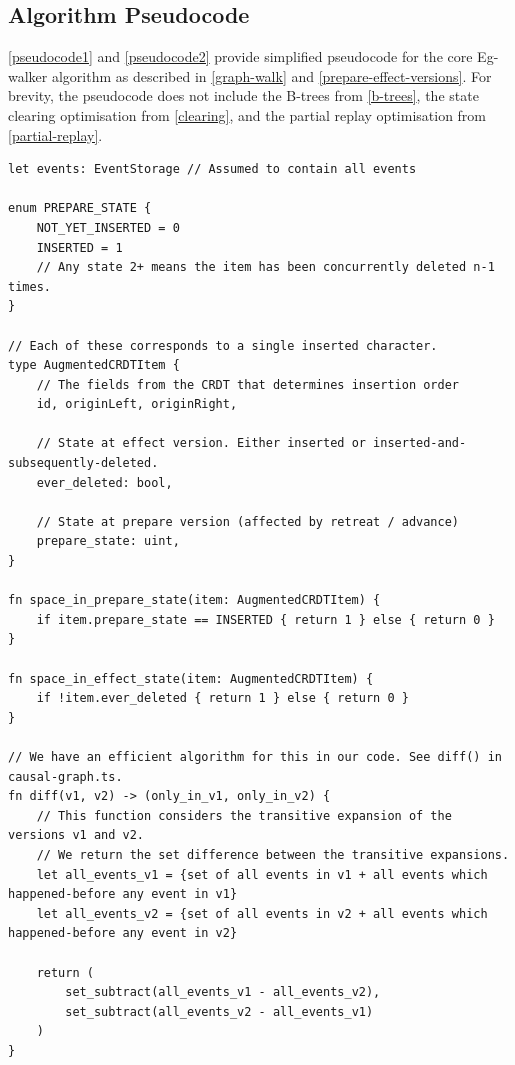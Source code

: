 \documentclass[sigplan,10pt]{acmart}
\newif\ifincludeappendix
\newcommand{\algname}{Eg-walker\xspace}
\begin{document}
\ifincludeappendix
\begin{listing*}
\section{Algorithm Pseudocode}\label{pseudocode-appendix}

\begin{flushleft}
\autoref{pseudocode1} and \autoref{pseudocode2} provide simplified pseudocode for the core \algname algorithm as described in \autoref{graph-walk} and \ref{prepare-effect-versions}.
For brevity, the pseudocode does not include the B-trees from \autoref{b-trees}, the state clearing optimisation from \autoref{clearing}, and the partial replay optimisation from \autoref{partial-replay}.
\end{flushleft}

\footnotesize
\vspace{5cm}
\begin{verbatim}
let events: EventStorage // Assumed to contain all events

enum PREPARE_STATE {
    NOT_YET_INSERTED = 0
    INSERTED = 1
    // Any state 2+ means the item has been concurrently deleted n-1 times.
}

// Each of these corresponds to a single inserted character.
type AugmentedCRDTItem {
    // The fields from the CRDT that determines insertion order
    id, originLeft, originRight,

    // State at effect version. Either inserted or inserted-and-subsequently-deleted.
    ever_deleted: bool,

    // State at prepare version (affected by retreat / advance)
    prepare_state: uint,
}

fn space_in_prepare_state(item: AugmentedCRDTItem) {
    if item.prepare_state == INSERTED { return 1 } else { return 0 }
}

fn space_in_effect_state(item: AugmentedCRDTItem) {
    if !item.ever_deleted { return 1 } else { return 0 }
}

// We have an efficient algorithm for this in our code. See diff() in causal-graph.ts.
fn diff(v1, v2) -> (only_in_v1, only_in_v2) {
    // This function considers the transitive expansion of the versions v1 and v2.
    // We return the set difference between the transitive expansions.
    let all_events_v1 = {set of all events in v1 + all events which happened-before any event in v1}
    let all_events_v2 = {set of all events in v2 + all events which happened-before any event in v2}

    return (
        set_subtract(all_events_v1 - all_events_v2),
        set_subtract(all_events_v2 - all_events_v1)
    )
}
\end{verbatim}
\caption{Pseudocode for the \algname algorithm (continued in \autoref{pseudocode2}).}\label{pseudocode1}
\end{listing*}
\end{document}
